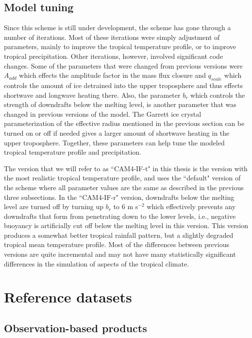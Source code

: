 \documentclass[letterpaper,12pt,titlepage,oneside,final]{book}
\begin{document}
\subsection{Model tuning}\label{tune}

Since this scheme is still under development, the scheme has gone through a number of iterations. Most of these iterations were simply adjustment of parameters, mainly to improve the tropical temperature profile, or to improve tropical precipitation. Other iterations, however, involved significant code changes. Some of the parameters that were changed from previous versions were $A_{add}$ which effects the amplitude factor in the mass flux closure and $q_{scale}$ which controls the amount of ice detrained into the upper troposphere and thus effects shortwave and longwave heating there. Also, the parameter $b_{r}$ which controls the strength of downdrafts below the melting level, is another parameter that was changed in previous versions of the model. The Garrett ice crystal parameterization of the effective radius mentioned in the previous section can be turned on or off if needed gives a larger amount of shortwave heating in the upper troposphere. Together, these parameters can help tune the modeled tropical temperature profile and precipitation.

The version that we will refer to as ``CAM4-IF-t" in this thesis is the version with the most realistic tropical temperature profile, and uses the ``default" version of the scheme where all parameter values are the same as described in the previous three subsections. In the ``CAM4-IF-r" version, downdrafts below the melting level are turned off by turning up $b_{r}$ to 6 m s$^{-2}$ which effectively prevents any downdrafts that form from penetrating down to the lower levels, i.e., negative buoyancy is artificially cut off below the melting level in this version. This version produces a somewhat better tropical rainfall pattern, but a slightly degraded tropical mean temperature profile. Most of the differences between previous versions are quite incremental and may not have many statistically significant differences in the simulation of aspects of the tropical climate.

\section{Reference datasets}\label{datasets}
\subsection{Observation-based products}
\end{document}
